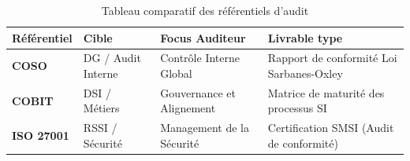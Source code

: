 \begin{table}[h!]
\centering
\small
\renewcommand{\arraystretch}{1.5}
\begin{tabular}{|l|l|l|l|}
    \hline
    \rowcolor{blue!10} \textbf{Référentiel} & \textbf{Cible} & \textbf{Focus Auditeur} & \textbf{Livrable type} \\ \hline
    \textbf{COSO} & DG / Audit Interne & Contrôle Interne Global & Rapport de conformité Loi Sarbanes-Oxley \\ \hline
    \textbf{COBIT} & DSI / Métiers & Gouvernance et Alignement & Matrice de maturité des processus SI \\ \hline
    \textbf{ISO 27001} & RSSI / Sécurité & Management de la Sécurité & Certification SMSI (Audit de conformité) \\ \hline
\end{tabular}
\caption{Tableau comparatif des référentiels d'audit}
\end{table}

